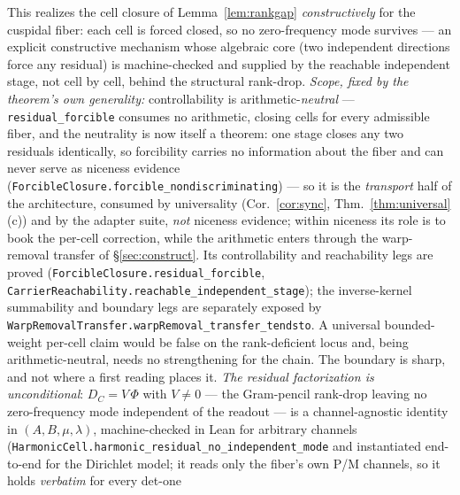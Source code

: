 \documentclass[11pt]{article}
\theoremstyle{definition}
\begin{document}
\noindent This realizes the cell closure of Lemma~\ref{lem:rankgap} \emph{constructively} for the cuspidal
fiber: each cell is forced closed, so no zero-frequency mode survives --- an explicit constructive mechanism whose
algebraic core (two independent directions force any residual) is machine-checked and supplied by the reachable
independent stage, not cell by cell, behind the structural rank-drop. \emph{Scope, fixed by the theorem's own generality:}
controllability is arithmetic-\emph{neutral} --- \texttt{residual\_forcible} consumes no arithmetic, closing
cells for every admissible fiber, and the neutrality is now itself a theorem: one stage closes any two
residuals identically, so forcibility carries no information about the fiber and can never serve as
niceness evidence (\texttt{ForcibleClosure.forcible\_nondiscriminating}) --- so it is the
\emph{transport} half of the architecture, consumed by
universality (Cor.~\ref{cor:sync}, Thm.~\ref{thm:universal}\,(c)) and by the adapter suite, \emph{not} niceness
evidence; within niceness its role is to book the per-cell correction, while the arithmetic enters through the
warp-removal transfer of \S\ref{sec:construct}. Its controllability and reachability legs are proved
(\texttt{ForcibleClosure.residual\_forcible}, \texttt{CarrierReachability.reachable\_independent\_stage});
the inverse-kernel summability and boundary legs are separately exposed by
\texttt{WarpRemovalTransfer.warpRemoval\_transfer\_tendsto}. A
universal bounded-weight per-cell claim would be false on the rank-deficient locus and, being
arithmetic-neutral, needs no strengthening for the chain. The boundary is sharp, and not where a first reading places it. \emph{The residual factorization is
unconditional}: $D_C=V\,\Phi$ with $V\neq0$ --- the Gram-pencil rank-drop leaving no
zero-frequency mode independent of the readout --- is a channel-agnostic identity in $(A,B,\mu,\lambda)$,
machine-checked in Lean for arbitrary channels
(\texttt{HarmonicCell.harmonic\_residual\_no\_independent\_mode} and instantiated end-to-end for the
Dirichlet model; it reads only the fiber's own P/M channels, so it holds \emph{verbatim} for every det-one
\end{document}
